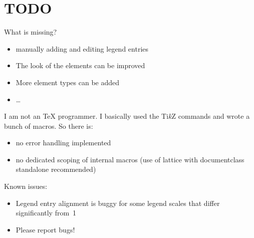 \documentclass[a4paper]{scrartcl}
\newcommand{\tikzlabel}{Ti\textit{k}Z}
\begin{document}
\section{TODO}
\label{sec:todo}

What is missing? 
\begin{itemize}
\item manually adding and editing legend entries
\item The look of the elements can be improved
\item More element types can be added
\item \ldots{}
\end{itemize}

I am not an \TeX{} programmer. I basically used the \tikzlabel{} commands and wrote a
bunch of macros. So there is:
\begin{itemize}
\item no error handling implemented
\item no dedicated scoping of internal macros (use of lattice with documentclass standalone recommended)
\end{itemize}

Known issues:
\begin{itemize}
\item Legend entry alignment is buggy for some legend scales that differ significantly
  from~1
\item Please report bugs!
\end{itemize}
\end{document}
